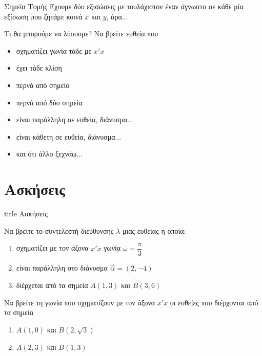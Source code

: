 \documentclass{presentation}
\begin{document}
\begin{frame}{Σημεία Τομής}
  Έχουμε δύο εξισώσεις με τουλάχιστον έναν άγνωστο σε κάθε μία εξίσωση που ζητάμε κοινά $x$ και $y$, άρα...
\end{frame}

\begin{frame}{Τι θα μπορούμε να λύσουμε?}
  Να βρείτε ευθεία που
  \begin{itemize}[<+->]
    \item σχηματίζει γωνία τάδε με $x'x$
    \item έχει τάδε κλίση
    \item περνά από σημείο
    \item περνά από δύο σημεία
    \item είναι παράλληλη σε ευθεία, διάνυσμα...
    \item είναι κάθετη σε ευθεία, διάνυσμα...
    \item και ότι άλλο ξεχνάω...
  \end{itemize}
\end{frame}


\section{Ασκήσεις}

\begin{frame}[noframenumbering]
  \vfill
  \centering
  \begin{beamercolorbox}[sep=8pt,center,shadow=true,rounded=true]{title}
    Ασκήσεις
  \end{beamercolorbox}
  \vfill
\end{frame}

\begin{askisi}
  Να βρείτε το συντελεστή διεύθυνσης $λ$ μιας ευθείας η οποία:
  \begin{enumerate}[<+->]
    \item σχηματίζει με τον άξονα $x'x$ γωνία $ω=\dfrac{π}{3}$
    \item είναι παράλληλη στο διάνυσμα $\vec{α}=(2,-4)$
    \item διέρχεται από τα σημεία $Α(1,3)$ και $Β(3,6)$
  \end{enumerate}
\end{askisi}

\begin{askisi}
  Να βρείτε τη γωνία που σχηματίζουν με τον άξονα $x'x$ οι ευθείες που διέρχονται από τα σημεία
  \begin{enumerate}[<+->]
    \item $Α(1,0)$ και $Β(2,\sqrt{3})$
    \item $Α(2,3)$ και $Β(1,3)$
  \end{enumerate}
\end{askisi}
\end{document}
